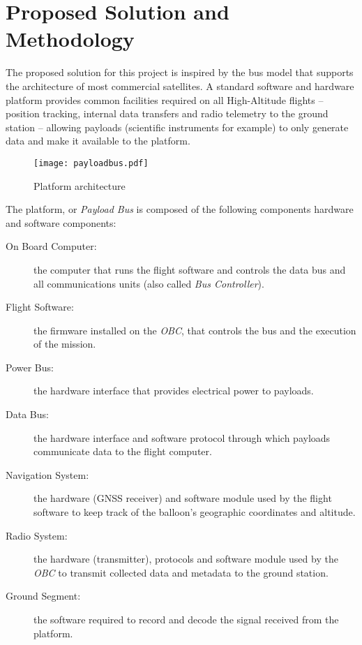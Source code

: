 \chapter{Proposed Solution and Methodology}
\label{ch:methodology}

%

The proposed solution for this project is inspired by the bus model that
supports the architecture of most commercial satellites. A standard software
and hardware platform provides common facilities required on all High-Altitude
flights – position tracking, internal data transfers and radio telemetry to the
ground station – allowing payloads (scientific instruments for example) to
only generate data and make it available to the platform.

\begin{figure}[H]
\texttt{[image: payloadbus.pdf]}
\centering
\caption{Platform architecture}
\end{figure}

The platform, or \textit{Payload Bus} is composed of the following components 
hardware and software components:

\begin{description}
    
\item[On Board Computer:] the computer that runs the flight software and
controls the data bus and all communications units (also called
\textit{Bus Controller}).

\item[Flight Software:] the firmware installed on the \textit{OBC}, that
controls the bus and the execution of the mission.

\item[Power Bus:] the hardware interface that provides electrical power to
payloads.

\item[Data Bus:] the hardware interface and software protocol through which
payloads communicate data to the flight computer.

\item[Navigation System:] the hardware (GNSS receiver) and software module used
by the flight software to keep track of the balloon's geographic coordinates and
altitude.

\item[Radio System:] the hardware (transmitter), protocols and software module
used by the \textit{OBC} to transmit collected data and metadata to the
ground station.

\item[Ground Segment:] the software required to record and decode the signal
received from the platform.
    
\end{description}

